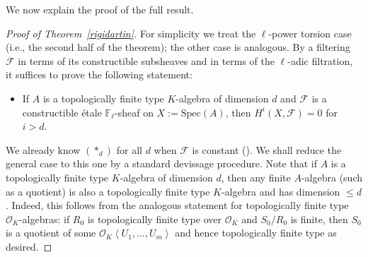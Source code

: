 \documentclass[reqno]{amsart}
\newcommand{\sF}{\mathcal{F}}
\newcommand{\spec}{\mathrm{Spec}}
\theoremstyle{definition}
\begin{document}
We now explain the proof of the full result. 
\begin{proof}[Proof of Theorem~\ref{rigidartin}] 
For simplicity we treat the $\ell$-power torsion case (i.e., the second half of
the theorem); the other case is analogous. By a filtering $\sF$ in terms of its constructible subsheaves \cite[Tag 03SA]{stacks-project} and in terms of the $\ell$-adic filtration, it suffices to prove the following statement: 

\begin{itemize}[leftmargin=0.8in, rightmargin=0.8in]
\item[$(\ast_d):$] If $A$ is a topologically finite type $K$-algebra of dimension $d$ and $\sF$ is a constructible \'etale $\mathbb{F}_\ell$-sheaf on $X := \spec(A)$, then $H^i(X, \sF) = 0$ for $i > d$. 
\end{itemize}

We already know $(\ast_d)$ for all $d$ when $\sF$ is constant
(). We shall reduce the general case to this one by a
standard devissage procedure. Note that if $A$ is a topologically finite type $K$-algebra of dimension
$d$, then any finite $A$-algebra (such as a quotient) is also a topologically finite type $K$-algebra
and has dimension $\leq d$. Indeed, this follows from the analogous statement for topologically finite type 
$\mathcal{O}_K$-algebras: if $R_0$ is topologically finite type over $\mathcal{O}_K$ and $S_0/R_0$ is
finite, then $S_0$ is a quotient of some $\mathcal{O}_K\left \langle
U_1, \dots, U_m\right\rangle$ and hence topologically finite type as desired.


\end{proof}
\end{document}
